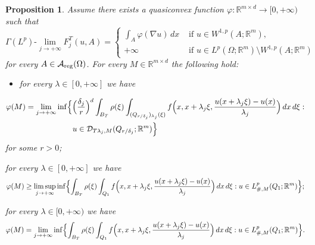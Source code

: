 \documentclass{article}
\newtheorem{proposition}[lemma]{Proposition}
\theoremstyle{definition}
\newcommand{\f}{\varphi}
\newcommand{\dej}{\delta_j}
\newcommand{\R}{\mathbb{R}}
\newcommand{\A}{\mathcal{A}}
\begin{document}
\begin{proposition}\label{prop : cell formula}
    Assume there exists a quasiconvex function $\varphi: \R^{m\times d}\to[0,+\infty)$ such that 
\begin{equation*}
     \Gamma(L^p)\text{-}\lim_{j\to+\infty} F^T_j(u,A) = \begin{cases}
            \displaystyle \int_{A} \f(\nabla u)\,dx & \text{ if } u\in W^{1,p}(A;\R^m), \\
            +\infty & \text{ if } u\in L^p(\Omega;\R^m)\setminus W^{1,p}(A;\R^m)
        \end{cases}
\end{equation*}
for every $A\in\A_{\rm reg}(\Omega)$. For every $M\in\R^{m\times d}$ the following hold:
\begin{itemize}
    \item[(i)]  for every $\lambda\in[0,+\infty]$ we have
\end{itemize}\begin{align*}
    \f(M) & = \lim_{j\to+\infty} \inf\Bigl\{ \Bigl(\frac{\dej}{r}\Bigr)^d\int_{B_T} \rho(\xi)\int_{(Q_{r/\dej})_{\lambda_j}(\xi)} f\Bigl(x, x+\lambda_j\xi, \frac{u(x+\lambda_j\xi)-u(x)}{\lambda_j}\Bigr)\, dx\,d\xi : \\
    & \qquad \qquad \qquad u\in \mathcal{D}_{T\lambda_j,M}(Q_{r/\dej};\R^m) \Bigr\}
\end{align*}
for some $r>0$;
\item[(ii)] for every $\lambda\in[0,+\infty]$ we have 
\begin{equation*}
    \f(M) \geq \limsup_{j\to+\infty} \inf\Bigl\{ \int_{B_T} \rho(\xi)\int_{Q_1} f\Bigl(x,x+\lambda_j\xi,\frac{u(x+\lambda_j\xi)-u(x)}{\lambda_j}\Bigr)\, dx\,d\xi : u\in L^p_{\#,M}(Q_1;\R^m) \Bigr\};
\end{equation*}
\item[(iii)] for every $\lambda\in[0,+\infty)$ we have
\begin{equation*}
    \f(M) = \lim_{j\to+\infty} \inf\Bigl\{ \int_{B_T} \rho(\xi)\int_{Q_1} f\Bigl(x,x+\lambda_j\xi,\frac{u(x+\lambda_j\xi)-u(x)}{\lambda_j}\Bigr)\, dx\,d\xi : u\in L^p_{\#,M}(Q_1;\R^m) \Bigr\}.
\end{equation*}
\end{proposition}
\end{document}

